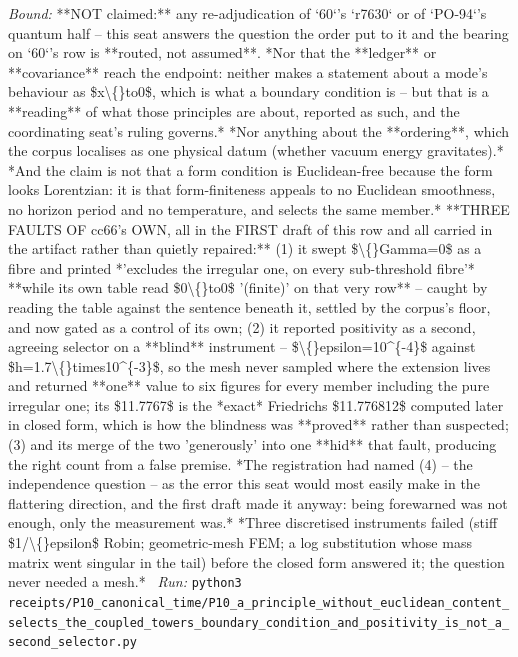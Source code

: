 \begin{description}
 \emph{Bound:} **NOT claimed:** any re-adjudication of `60`'s `r7630` or of `PO-94`'s quantum half -- this seat answers the question the order put to it and the bearing on `60`'s row is **routed, not assumed**.  *Nor that the **ledger** or **covariance** reach the endpoint: neither makes a statement about a mode's behaviour as \$x\textbackslash\{\}to0\$, which is what a boundary condition is -- but that is a **reading** of what those principles are about, reported as such, and the coordinating seat's ruling governs.*  *Nor anything about the **ordering**, which the corpus localises as one physical datum (whether vacuum energy gravitates).*  *And the claim is not that a form condition is Euclidean-free because the form looks Lorentzian: it is that form-finiteness appeals to no Euclidean smoothness, no horizon period and no temperature, and selects the same member.*  **THREE FAULTS OF cc66's OWN, all in the FIRST draft of this row and all carried in the artifact rather than quietly repaired:** (1) it swept \$\textbackslash\{\}Gamma=0\$ as a fibre and printed *'excludes the irregular one, on every sub-threshold fibre'* **while its own table read \$0\textbackslash\{\}to0\$ '(finite)' on that very row** -- caught by reading the table against the sentence beneath it, settled by the corpus's floor, and now gated as a control of its own; (2) it reported positivity as a second, agreeing selector on a **blind** instrument -- \$\textbackslash\{\}epsilon=10\textasciicircum{}\{-4\}\$ against \$h=1.7\textbackslash\{\}times10\textasciicircum{}\{-3\}\$, so the mesh never sampled where the extension lives and returned **one** value to six figures for every member including the pure irregular one; its \$11.7767\$ is the *exact* Friedrichs \$11.776812\$ computed later in closed form, which is how the blindness was **proved** rather than suspected; (3) and its merge of the two 'generously' into one **hid** that fault, producing the right count from a false premise.  *The registration had named (4) -- the independence question -- as the error this seat would most easily make in the flattering direction, and the first draft made it anyway: being forewarned was not enough, only the measurement was.*  *Three discretised instruments failed (stiff \$1/\textbackslash\{\}epsilon\$ Robin; geometric-mesh FEM; a log substitution whose mass matrix went singular in the tail) before the closed form answered it; the question never needed a mesh.*
\ \emph{Run:} \texttt{python3 receipts/P10\_canonical\_time/P10\_a\_principle\_without\_euclidean\_content\_selects\_the\_coupled\_towers\_boundary\_condition\_and\_positivity\_is\_not\_a\_second\_selector.py}

\end{description}
